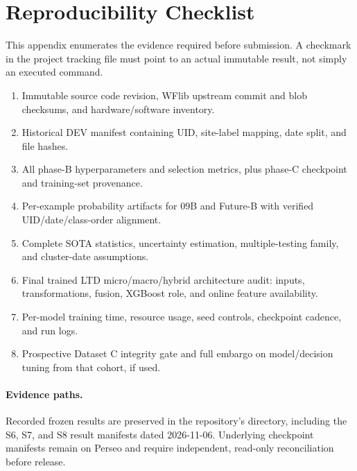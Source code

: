 \section{Reproducibility Checklist}\label{app:repro}
This appendix enumerates the evidence required before submission. A checkmark in the project tracking file must point to an actual immutable result, not simply an executed command.
\begin{enumerate}[leftmargin=*]
\item Immutable source code revision, WFlib upstream commit and blob checksums, and hardware/software inventory.
\item Historical DEV manifest containing UID, site-label mapping, date split, and file hashes.
\item All phase-B hyperparameters and selection metrics, plus phase-C checkpoint and training-set provenance.
\item Per-example probability artifacts for 09B and Future-B with verified UID/date/class-order alignment.
\item Complete SOTA statistics, uncertainty estimation, multiple-testing family, and cluster-date assumptions.
\item Final trained LTD micro/macro/hybrid architecture audit: inputs, transformations, fusion, XGBoost role, and online feature availability.
\item Per-model training time, resource usage, seed controls, checkpoint cadence, and run logs.
\item Prospective Dataset C integrity gate and full embargo on model/decision tuning from that cohort, if used.
\end{enumerate}
\paragraph{Evidence paths.} Recorded frozen results are preserved in the repository's
 directory, including the S6, S7,
and S8 result manifests dated 2026-11-06. Underlying checkpoint manifests
remain on Perseo and require independent, read-only reconciliation before release.
